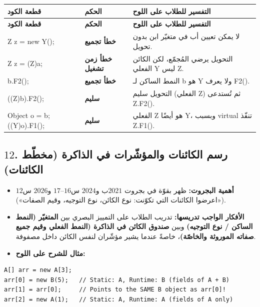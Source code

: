 \documentclass[14pt]{extarticle}
\begin{document}
{\renewcommand{\arraystretch}{1.15}
\small
\begin{longtable}{|>{\raggedright\arraybackslash}p{}|C{0.20\textwidth}|>{\raggedleft\arraybackslash}p{0.38\textwidth}|}
\hline
\textbf{قطعة الكود} & \textbf{الحكم} & \textbf{التفسير للطلاب على اللوح} \\
\hline
\endfirsthead
\hline
\textbf{قطعة الكود} & \textbf{الحكم} & \textbf{التفسير للطلاب على اللوح} \\
\hline
\endhead
\textenglish{Z z = new Y();} & \textbf{خطأ تجميع} & لا يمكن تعيين أب في متغيّر ابن بدون تحويل. \\
\hline
\textenglish{Z z = (Z)a;} & \textbf{خطأ زمن تشغيل} & التحويل يرضي المُجمّع، لكن الكائن الفعلي \textenglish{Y} ليس \textenglish{Z}. \\
\hline
\textenglish{b.F2();} & \textbf{خطأ تجميع} & النمط الساكن لـ \textenglish{b} هو \textenglish{Y} ولا يعرف \textenglish{F2()}. \\
\hline
\textenglish{((Z)b).F2();} & \textbf{سليم} & التحويل سليم (الفعلي \textenglish{Z}) ثم تُستدعى \textenglish{Z.F2()}. \\
\hline
\textenglish{Object o = b; ((Y)o).F1();} & \textbf{سليم} & الفعلي \textenglish{Z} هو أيضًا \textenglish{Y}، وبسبب \textenglish{virtual} تنفّذ \textenglish{Z.F1()}. \\
\hline
\end{longtable}}

\filbreak
\subsection*{$12$. رسم الكائنات والمؤشّرات في الذاكرة (مخطّط الكائنات)}
\begin{itemize}[itemsep=0.25em]
    \item \textbf{أهمية البجروت:} ظهر بقوّة في بجروت $2021$ب و$2024$ س$16$--$17$ و$2026$ س$12$ («اعرضوا الكائنات التي تكوّنت: نوع الكائن، نوع التوجيه، وقيم الصفات»).
    \item \textbf{الأفكار الواجب تدريسها:} تدريب الطلاب على التمييز البصري بين \textbf{المتغيّر (النمط الساكن / نوع التوجيه)} وبين \textbf{صندوق الكائن في الذاكرة (النمط الفعلي وقيم جميع صفاته الموروثة والخاصّة)}، خاصةً عندما يشير مؤشّران لنفس الكائن داخل مصفوفة.
    \item \textbf{مثال للشرح على اللوح:}
\end{itemize}
\begin{boxCode}
\begin{english}
\begin{verbatim}
A[] arr = new A[3];
arr[0] = new B(5);   // Static: A, Runtime: B (fields of A + B)
arr[1] = arr[0];     // Points to the SAME B object as arr[0]!
arr[2] = new A(1);   // Static: A, Runtime: A (fields of A only)
\end{verbatim}
\end{english}
\end{boxCode}
\end{document}
